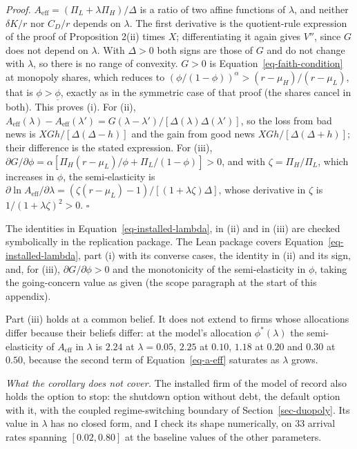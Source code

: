 \documentclass[
  11pt,
  letterpaper,
]{scrartcl}
\begin{document}
\emph{Proof.} \(A_{\text{eff}} = (\Pi_L + \lambda \Pi_H)/\Delta\) is a
ratio of two affine functions of \(\lambda\), and neither \(\delta K/r\)
nor \(C_D/r\) depends on \(\lambda\). The first derivative is the
quotient-rule expression of the proof of Proposition 2(ii) times \(X\);
differentiating it again gives \(V''\), since \(G\) does not depend on
\(\lambda\). With \(\Delta > 0\) both signs are those of \(G\) and do
not change with \(\lambda\), so there is no range of convexity.
\(G > 0\) is Equation~\ref{eq-faith-condition} at monopoly shares, which
reduces to \((\phi/(1-\phi))^\alpha > (r - \mu_H)/(r - \mu_L)\), that is
\(\phi > \underline{\phi}\), exactly as in the symmetric case of that
proof (the shares cancel in both). This proves (i). For (ii),
\(A_{\text{eff}}(\lambda) - A_{\text{eff}}(\lambda') = G(\lambda - \lambda')/[\Delta(\lambda)\Delta(\lambda')]\),
so the loss from bad news is \(X G h/[\Delta(\Delta - h)]\) and the gain
from good news \(X G h/[\Delta(\Delta + h)]\); their difference is the
stated expression. For (iii),
\(\partial G/\partial \phi = \alpha[\Pi_H(r - \mu_L)/\phi + \Pi_L/(1-\phi)] > 0\),
and with \(\zeta = \Pi_H/\Pi_L\), which increases in \(\phi\), the
semi-elasticity is
\(\partial \ln A_{\text{eff}}/\partial \lambda = (\zeta(r - \mu_L) - 1)/[(1 + \lambda\zeta)\Delta]\),
whose derivative in \(\zeta\) is \(1/(1 + \lambda\zeta)^2 > 0\).
\(\square\)

The identities in Equation~\ref{eq-installed-lambda}, in (ii) and in
(iii) are checked symbolically in the replication package. The Lean
package covers Equation~\ref{eq-installed-lambda}, part (i) with its
converse cases, the identity in (ii) and its sign, and, for (iii),
\(\partial G/\partial \phi > 0\) and the monotonicity of the
semi-elasticity in \(\phi\), taking the going-concern value as given
(the scope paragraph at the start of this appendix).

Part (iii) holds at a common belief. It does not extend to firms whose
allocations differ because their beliefs differ: at the model's
allocation \(\phi^*(\lambda)\) the semi-elasticity of \(A_{\text{eff}}\)
in \(\lambda\) is \(2.24\) at \(\lambda = 0.05\), \(2.25\) at \(0.10\),
\(1.18\) at \(0.20\) and \(0.30\) at \(0.50\), because the second term
of Equation~\ref{eq-a-eff} saturates as \(\lambda\) grows.

\emph{What the corollary does not cover.} The installed firm of the
model of record also holds the option to stop: the shutdown option
without debt, the default option with it, with the coupled
regime-switching boundary of Section~\ref{sec-duopoly}. Its value in
\(\lambda\) has no closed form, and I check its shape numerically, on
\(33\) arrival rates spanning \([0.02, 0.80]\) at the baseline values of
the other parameters.
\end{document}
